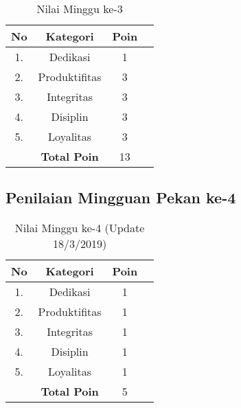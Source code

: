 \begin{table}[htp]
\centering
\caption{Nilai Minggu ke-3}
\label{tab:nm03}
\begin{tabular}{|c|c|c|p{\textwidth}|}
\hline
\textbf{No} & \textbf{Kategori} & \textbf{Poin} \\ \hline
1. & Dedikasi & 1 \\ \hline
2. & Produktifitas & 3 \\ \hline
3. & Integritas & 3 \\ \hline
4. & Disiplin & 3 \\ \hline
5. & Loyalitas & 3 \\ \hline
 & \textbf{Total Poin} & 13 \\ \hline
\end{tabular}
\end{table}

\subsection{Penilaian Mingguan Pekan ke-4}

\begin{table}[htp]
\centering
\caption{Nilai Minggu ke-4 (Update 18/3/2019)}
\label{tab:nm04}
\begin{tabular}{|c|c|c|p{\textwidth}|}
\hline
\textbf{No} & \textbf{Kategori} & \textbf{Poin} \\ \hline
1. & Dedikasi & 1 \\ \hline
2. & Produktifitas & 1 \\ \hline
3. & Integritas & 1 \\ \hline
4. & Disiplin & 1 \\ \hline
5. & Loyalitas & 1 \\ \hline
 & \textbf{Total Poin} & 5 \\ \hline
\end{tabular}
\end{table}

